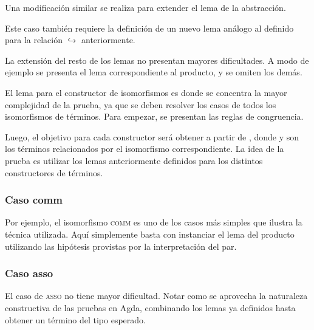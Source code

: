 
Una modificación similar se realiza para extender el lema de la abstracción.


Este caso también requiere la definición de un nuevo lema análogo al definido para la relación $\hookrightarrow$ anteriormente.


La extensión del resto de los lemas no presentan mayores dificultades.
A modo de ejemplo se presenta el lema correspondiente al producto, y se omiten los demás.


El lema para el constructor de isomorfismos es donde se concentra la mayor complejidad de la prueba, ya que se deben resolver los casos de todos los isomorfismos de términos.
Para empezar, se presentan las reglas de congruencia.


Luego, el objetivo para cada constructor será obtener \snstar{} a partir de \snstar{}, donde  y  son los términos relacionados por el isomorfismo correspondiente.
La idea de la prueba es utilizar los lemas anteriormente definidos para los distintos constructores de términos.

\subsubsection{Caso comm}

Por ejemplo, el isomorfismo \textsc{comm} es uno de los casos más simples que ilustra la técnica utilizada.
Aquí simplemente basta con instanciar el lema del producto utilizando las hipótesis provistas por la interpretación del par.


\subsubsection{Caso asso}

El caso de \textsc{asso} no tiene mayor dificultad.
Notar como se aprovecha la naturaleza constructiva de las pruebas en Agda, combinando los lemas ya definidos hasta obtener un término del tipo esperado.

